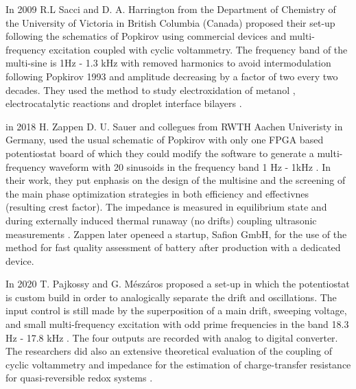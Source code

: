 In 2009 R.L Sacci and D. A. Harrington from the Department of Chemistry of the University of Victoria in British Columbia (Canada) proposed their set-up following the schematics of Popkirov using commercial devices and multi-frequency excitation coupled with cyclic voltammetry. The frequency band of the multi-sine is 1Hz - 1.3 kHz with removed harmonics to avoid intermodulation following Popkirov 1993 and amplitude decreasing by a factor of two every two decades.
They used the method to study electroxidation of metanol  \cite{sacciDynamicImpedanceFormic2009}
\cite{holmUnderstandingReactionMechanisms2018} \cite{holmDynamicElectrochemicalImpedance2019} \cite{holmUnderstandingReactionMechanisms2019} ,  electrocatalytic reactions \cite{sacciDynamicElectrochemicalImpedance2014} and droplet interface bilayers \cite{sacciDisentanglingMemristiveMemcapacitive2022}.

in 2018 H. Zappen D. U. Sauer and collegues from RWTH Aachen Univeristy in Germany, used the usual schematic of Popkirov with only one FPGA based potentiostat board of which they could modify the software to generate a multi-frequency waveform with 20 sinusoids in the frequency band 1 Hz - 1kHz \cite{zappenApplicationTimeResolvedMultiSine2018}. In their work, they put enphasis on the design of the multisine and the screening of the main phase optimization strategies in both efficiency and effectivnes (resulting crest factor). The impedance is measured in equilibrium state and during externally induced thermal runaway (no drifts) coupling ultrasonic measurements \cite{zappenInOperandoImpedanceSpectroscopy2020a}. Zappen later openeed a startup, Safion GmbH, for the use of the method for fast quality assessment of battery after production with a dedicated device.

In 2020 T. Pajkossy and G. Mészáros proposed a set-up in which the potentiostat is custom build in order to analogically separate the drift and oscillations. The input control is still made by the superposition of a main drift, sweeping voltage, and small multi-frequency excitation with odd prime frequencies in the band 18.3 Hz - 17.8 kHz \cite{pajkossyConnectionCVsImpedance2020}. The four outputs are recorded with analog to digital converter. The researchers did also an extensive theoretical evaluation of the coupling of cyclic voltammetry and impedance for the estimation of charge-transfer resistance for quasi-reversible redox systems \cite{pajkossyDynamicElectrochemicalImpedance2019}  \cite{pajkossyVoltammetryCoupledImpedance2020} \cite{pajkossyDynamicElectrochemicalImpedance2021}. 

